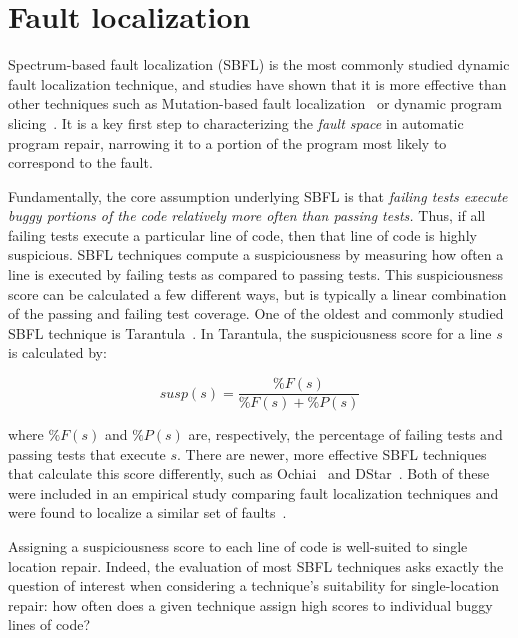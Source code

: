 \section{Fault localization} \label{secFL}



Spectrum-based fault localization (SBFL) is the most commonly studied dynamic
fault localization technique, and studies have shown that it is more effective
than other techniques such as Mutation-based fault
localization~\cite{mut-analysis} or dynamic program
slicing~\cite{zou2019empirical}. It is a key first step to characterizing the
\emph{fault space} in automatic program repair, narrowing it to a portion of the
program most likely to correspond to the fault.

Fundamentally, the core assumption underlying SBFL is that \emph{failing tests
  execute buggy portions of the code relatively more often than passing tests.}
Thus, if all failing tests execute a particular line of code, then that line of
code is highly suspicious.  SBFL techniques compute a suspiciousness by
measuring how often a line is executed by failing tests as compared to passing
tests. This suspiciousness score can be calculated a few different ways, but is
typically a linear combination of the passing and failing test coverage. One of
the oldest and commonly studied SBFL technique is Tarantula~\cite{tarantula}. In
Tarantula, the suspiciousness score for a line $s$ is calculated by:

$$\mathit{susp(s)} 
=\frac{\mathit{\%F(s)}}{\mathit{\%F(s)} + \mathit{\%P(s)}}$$

where  $\mathit{\%F(s)}$ and $\mathit{\%P(s)}$ are, respectively, the percentage of failing 
tests and passing tests that execute $s$. There are newer, more effective 
SBFL techniques that calculate this score differently, such as Ochiai~\cite{ochiai} and 
DStar~\cite{wong2013dstar}. Both of these were included in an empirical study 
comparing fault localization techniques and were found to localize a similar set of 
faults~\cite{zou2019empirical}.

Assigning a suspiciousness score to each line of code is well-suited to single
location repair. Indeed, the evaluation of most SBFL techniques asks exactly the
question of interest when considering a technique's suitability for
single-location repair: how often does a given technique assign high scores to 
individual buggy lines of code?

